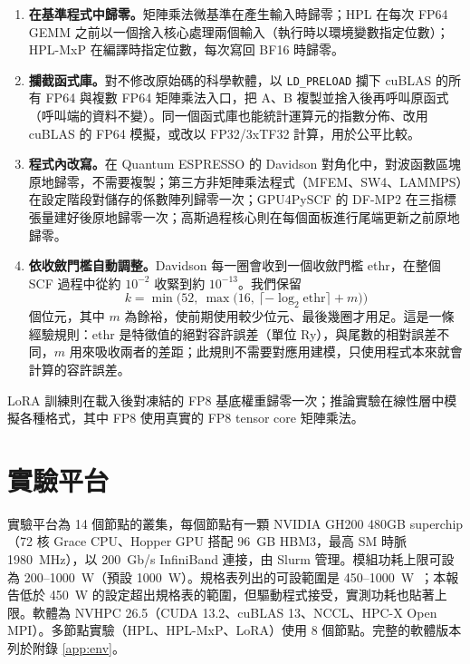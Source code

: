 \begin{enumerate}
  \item \textbf{在基準程式中歸零。}矩陣乘法微基準在產生輸入時歸零；HPL 在每次 FP64 GEMM 之前以一個捨入核心處理兩個輸入（執行時以環境變數指定位數）；HPL-MxP 在編譯時指定位數，每次寫回 BF16 時歸零。
  \item \textbf{攔截函式庫。}對不修改原始碼的科學軟體，以 \texttt{LD\_PRELOAD} 攔下 cuBLAS 的所有 FP64 與複數 FP64 矩陣乘法入口，把 A、B 複製並捨入後再呼叫原函式（呼叫端的資料不變）。同一個函式庫也能統計運算元的指數分佈、改用 cuBLAS 的 FP64 模擬，或改以 FP32/3xTF32 計算，用於公平比較。
  \item \textbf{程式內改寫。}在 Quantum ESPRESSO 的 Davidson 對角化中，對波函數區塊原地歸零，不需要複製；第三方非矩陣乘法程式（MFEM、SW4、LAMMPS）在設定階段對儲存的係數陣列歸零一次；GPU4PySCF 的 DF-MP2 在三指標張量建好後原地歸零一次；高斯過程核心則在每個面板進行尾端更新之前原地歸零。
  \item \textbf{依收斂門檻自動調整。}Davidson 每一圈會收到一個收斂門檻 ethr，在整個 SCF 過程中從約 $10^{-2}$ 收緊到約 $10^{-13}$。我們保留
  \begin{equation}
    k = \min\bigl(52,\ \max\bigl(16,\ \lceil -\log_2 \mathrm{ethr} \rceil + m\bigr)\bigr)
    \label{eq:adapt}
  \end{equation}
  個位元，其中 $m$ 為餘裕，使前期使用較少位元、最後幾圈才用足。這是一條經驗規則：ethr 是特徵值的絕對容許誤差（單位 Ry），與尾數的相對誤差不同，$m$ 用來吸收兩者的差距；此規則不需要對應用建模，只使用程式本來就會計算的容許誤差。
\end{enumerate}

LoRA 訓練則在載入後對凍結的 FP8 基底權重歸零一次；推論實驗在線性層中模擬各種格式，其中 FP8 使用真實的 FP8 tensor core 矩陣乘法。

\section{實驗平台}\label{sec:platform}

實驗平台為 14 個節點的叢集，每個節點有一顆 NVIDIA GH200 480GB superchip（72 核 Grace CPU、Hopper GPU 搭配 96~GB HBM3，最高 SM 時脈 1980~MHz），以 200~Gb/s InfiniBand 連接，由 Slurm 管理。模組功耗上限可設為 200–1000~W（預設 1000~W）。規格表列出的可設範圍是 450–1000~W~\cite{NVIDIAGH200}；本報告低於 450~W 的設定超出規格表的範圍，但驅動程式接受，實測功耗也貼著上限。軟體為 NVHPC 26.5（CUDA 13.2、cuBLAS 13、NCCL、HPC-X Open MPI）。多節點實驗（HPL、HPL-MxP、LoRA）使用 8 個節點。完整的軟體版本列於附錄 \ref{app:env}。

